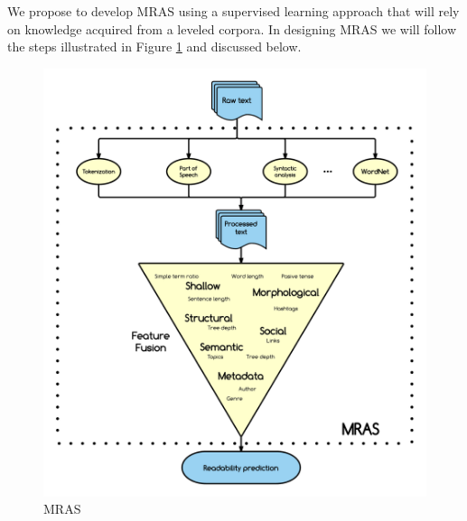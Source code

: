 \documentclass{bsu-ms}
\begin{document}
We propose to develop MRAS using a supervised learning approach that will rely on knowledge acquired from a leveled corpora. In designing MRAS we will follow the steps illustrated in Figure \ref{fig:pipeline} and discussed below.

\begin{figure}[h!]
\centering
\includegraphics[width=\textwidth]{pipelineGraph}
\caption{MRAS}
\label{fig:pipeline}
\end{figure}
\end{document}
